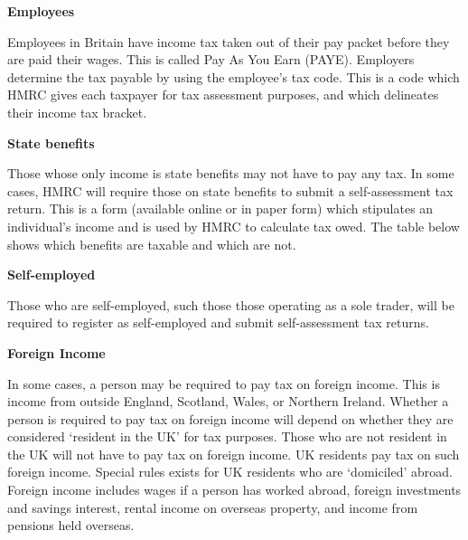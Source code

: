 \documentclass[]{tufte-handout}
\begin{document}
\textbf{Employees}

Employees in Britain have income tax taken out of their pay packet
before they are paid their wages. This is called Pay As You Earn (PAYE).
Employers determine the tax payable by using the employee's tax code.
This is a code which HMRC gives each taxpayer for tax assessment
purposes, and which delineates their income tax bracket.

\textbf{State benefits}

Those whose only income is state benefits may not have to pay any tax.
In some cases, HMRC will require those on state benefits to submit a
self-assessment tax return. This is a form (available online or in paper
form) which stipulates an individual's income and is used by HMRC to
calculate tax owed. The table below shows which benefits are taxable and
which are not.

\textbf{Self-employed}

Those who are self-employed, such those those operating as a sole
trader, will be required to register as self-employed and submit
self-assessment tax returns.

\textbf{Foreign Income}

In some cases, a person may be required to pay tax on foreign income.
This is income from outside England, Scotland, Wales, or Northern
Ireland. Whether a person is required to pay tax on foreign income will
depend on whether they are considered `resident in the UK' for tax
purposes. Those who are not resident in the UK will not have to pay tax
on foreign income. UK residents pay tax on such foreign income. Special
rules exists for UK residents who are `domiciled' abroad. Foreign income
includes wages if a person has worked abroad, foreign investments and
savings interest, rental income on overseas property, and income from
pensions held overseas.
\end{document}
